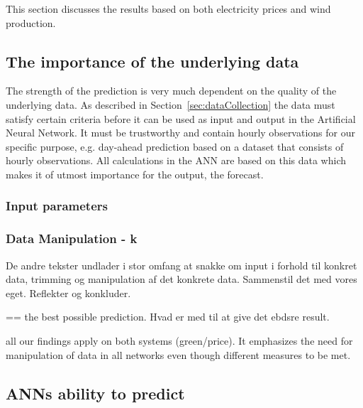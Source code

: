 This section discusses the results based on both electricity prices and wind production.

\subsection{The importance of the underlying data}
The strength of the prediction is very much dependent on the quality of the underlying data. As described in Section~\ref{sec:dataCollection} the data must satisfy certain criteria before it can be used as input and output in the Artificial Neural Network. It must be trustworthy and contain hourly observations for our specific purpose, e.g. day-ahead prediction based on a dataset that consists of hourly observations. All calculations in the ANN are based on this data which makes it of utmost importance for the output, the forecast.


\subsubsection{Input parameters}





\subsubsection{Data Manipulation - k}
De andre tekster undlader i stor omfang at snakke om input i forhold til konkret data, trimming og manipulation af det konkrete data. Sammenstil det med vores eget. Reflekter og konkluder.

== the best possible prediction. Hvad er med til at give det ebdsre result.

all our findings apply on both systems (green/price). It emphasizes the need for manipulation of data in all networks even though different measures to be met.

\subsection{ANNs ability to predict}


